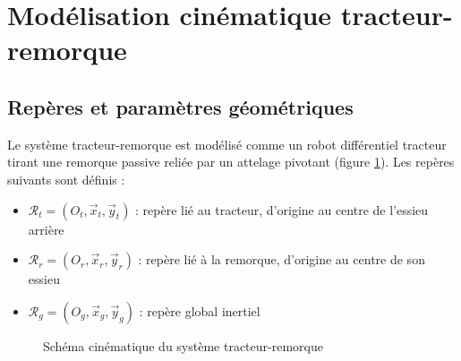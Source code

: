 \documentclass[a4paper,12pt]{report}
\begin{document}
\section{Modélisation cinématique tracteur-remorque}
\label{sec:modelisation_cinematique}

\subsection{Repères et paramètres géométriques}
\label{subsec:repres_geometriques}

Le système tracteur-remorque est modélisé comme un robot différentiel tracteur tirant une remorque passive reliée par un attelage pivotant (figure \ref{fig:schema_cinematique}). Les repères suivants sont définis :

\begin{itemize}
    \item $\mathcal{R}_t = (O_t, \vec{x}_t, \vec{y}_t)$ : repère lié au tracteur, d'origine au centre de l'essieu arrière
    \item $\mathcal{R}_r = (O_r, \vec{x}_r, \vec{y}_r)$ : repère lié à la remorque, d'origine au centre de son essieu
    \item $\mathcal{R}_g = (O_g, \vec{x}_g, \vec{y}_g)$ : repère global inertiel
\end{itemize}

\begin{figure}[htbp]
    \centering
    \caption{Schéma cinématique du système tracteur-remorque}
    \label{fig:schema_cinematique}
\end{figure}
\end{document}
